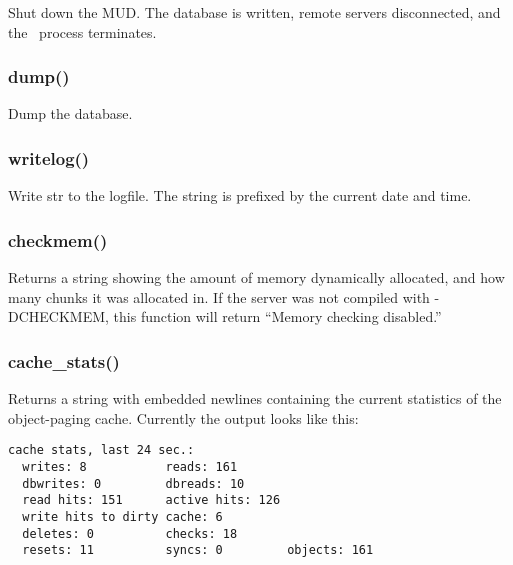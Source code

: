 Shut down the MUD.  The database is written, remote servers disconnected,
and the \COOLMUD\ process terminates.

\subsubsection{\func dump()}

Dump the database.

\subsubsection{\func writelog()}

Write {\funcarg str } to the logfile.  The string is prefixed by the
current date and time.

\subsubsection{\func checkmem()}

Returns a string showing the amount of memory dynamically allocated,
and how many chunks it was allocated in.  If the server was not
compiled with -DCHECKMEM, this function will return ``Memory checking
disabled.''

\subsubsection{\func cache\_stats()}

Returns a string with embedded newlines containing the current statistics
of the object-paging cache.  Currently the output looks like this:

\begin{verbatim}
cache stats, last 24 sec.:
  writes: 8           reads: 161  
  dbwrites: 0         dbreads: 10   
  read hits: 151      active hits: 126  
  write hits to dirty cache: 6    
  deletes: 0          checks: 18   
  resets: 11          syncs: 0         objects: 161  
\end{verbatim}


